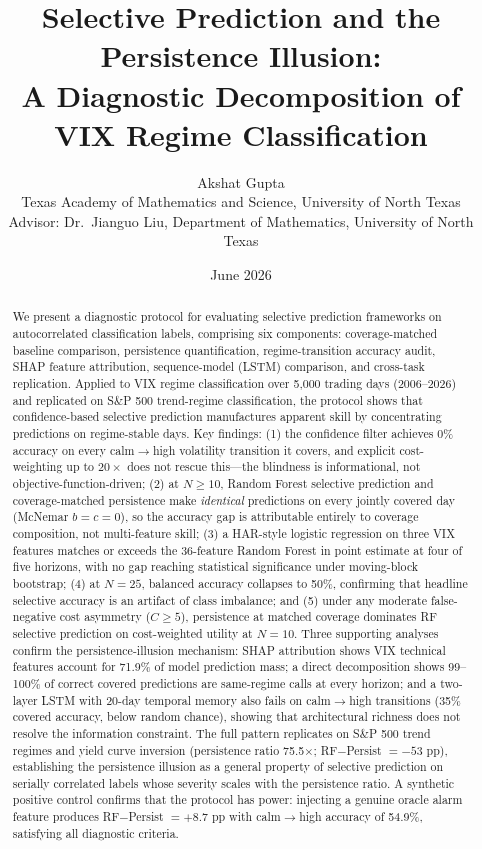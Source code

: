 \documentclass[11pt]{article}
\title{\textbf{Selective Prediction and the Persistence Illusion:\\
A Diagnostic Decomposition of VIX Regime Classification}}
\author{
    Akshat Gupta \\
    \small Texas Academy of Mathematics and Science, University of North Texas \\
    \small Advisor: Dr.\ Jianguo Liu, Department of Mathematics, University of North Texas
}
\date{June 2026}
\begin{document}
\maketitle

\begin{abstract}
We present a diagnostic protocol for evaluating selective prediction frameworks on autocorrelated classification labels, comprising six components: coverage-matched baseline comparison, persistence quantification, regime-transition accuracy audit, SHAP feature attribution, sequence-model (LSTM) comparison, and cross-task replication. Applied to VIX regime classification over 5,000 trading days (2006--2026) and replicated on S\&P 500 trend-regime classification, the protocol shows that confidence-based selective prediction manufactures apparent skill by concentrating predictions on regime-stable days. Key findings: (1) the confidence filter achieves 0\% accuracy on every calm$\to$high volatility transition it covers, and explicit cost-weighting up to $20{\times}$ does not rescue this---the blindness is informational, not objective-function-driven; (2) at $N \geq 10$, Random Forest selective prediction and coverage-matched persistence make \emph{identical} predictions on every jointly covered day (McNemar $b = c = 0$), so the accuracy gap is attributable entirely to coverage composition, not multi-feature skill; (3) a HAR-style logistic regression on three VIX features matches or exceeds the 36-feature Random Forest in point estimate at four of five horizons, with no gap reaching statistical significance under moving-block bootstrap; (4) at $N = 25$, balanced accuracy collapses to 50\%, confirming that headline selective accuracy is an artifact of class imbalance; and (5) under any moderate false-negative cost asymmetry ($C \geq 5$), persistence at matched coverage dominates RF selective prediction on cost-weighted utility at $N = 10$. Three supporting analyses confirm the persistence-illusion mechanism: SHAP attribution shows VIX technical features account for 71.9\% of model prediction mass; a direct decomposition shows 99--100\% of correct covered predictions are same-regime calls at every horizon; and a two-layer LSTM with 20-day temporal memory also fails on calm$\to$high transitions (35\% covered accuracy, below random chance), showing that architectural richness does not resolve the information constraint. The full pattern replicates on S\&P 500 trend regimes and yield curve inversion (persistence ratio 75.5$\times$; RF$-$Persist $= -53$ pp), establishing the persistence illusion as a general property of selective prediction on serially correlated labels whose severity scales with the persistence ratio. A synthetic positive control confirms that the protocol has power: injecting a genuine oracle alarm feature produces RF$-$Persist $= +8.7$ pp with calm$\to$high accuracy of 54.9\%, satisfying all diagnostic criteria.
\end{abstract}
\end{document}
